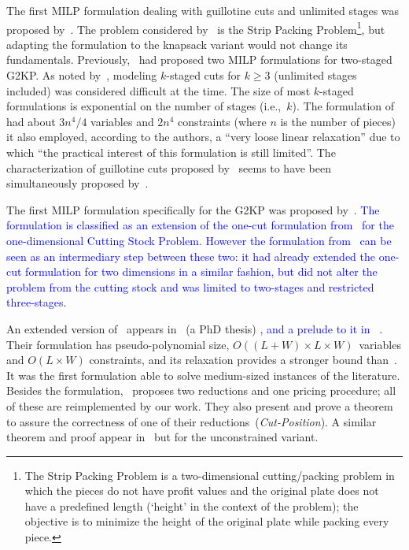 \documentclass[ppgc,tese,english,formais,babel]{iiufrgs}
\newif\iffinalversion
\newcommand{\newtext}[1]{\iffinalversion%
#1%
\else%
\textcolor{blue}{#1}%
\fi%
}
\begin{document}
The first MILP formulation dealing with guillotine cuts and unlimited stages was proposed by~\citet{messaoud:2008}.
The problem considered by~\citet{messaoud:2008} is the Strip Packing Problem\footnote{The Strip Packing Problem is a two-dimensional cutting/packing problem in which the pieces do not have profit values and the original plate does not have a predefined length (`height' in the context of the problem); the objective is to minimize the height of the original plate while packing every piece.}, but adapting the formulation to the knapsack variant would not change its fundamentals.
Previously, \citet{lodi:2003}~had proposed two MILP formulations for two-staged G2KP.
As noted by~\citet{belov_thesis:2003}, modeling \(k\)-staged cuts for \(k \geq 3\) (unlimited stages included) was considered difficult at the time.
The size of most \(k\)-staged formulations is exponential on the number of stages (i.e.,~\(k\)).
The formulation of~\citet{messaoud:2008} had about \(3n^4/4\) variables and \(2n^4\) constraints (where \(n\) is the number of pieces) it also employed, according to the authors, a ``very loose linear relaxation'' due to which ``the practical interest of this formulation is still limited''.
The characterization of guillotine cuts proposed by~\citet{messaoud:2008} seems to have been simultaneously proposed by~\citet{pisinger:2007}. %

The first MILP formulation specifically for the G2KP was proposed by~\citet{furini:2016}.
\newtext{The formulation is classified as an extension of the one-cut formulation from~\citet{dyckhoff:1981} for the one-dimensional Cutting Stock Problem.
However the formulation from~\citet{silva:2010} can be seen as an intermediary step between these two: it had already extended the one-cut formulation for two dimensions in a similar fashion, but did not alter the problem from the cutting stock and was limited to two-stages and restricted three-stages.}
An extended version of~\citet{furini:2016} appears in~\citet{dimitri_thesis} (a PhD thesis)\newtext{, and a prelude to it in~\citet{furini:conference:2016}}.
Their formulation has pseudo-polynomial size, \(O((L + W) \times L \times W)\)~variables and \(O(L \times W)\) constraints, and its relaxation provides a stronger bound than~\citet{messaoud:2008}.
It was the first formulation able to solve medium-sized instances of the literature.
Besides the formulation, \citet{furini:2016}~proposes two reductions and one pricing procedure; all of these are reimplemented by our work.
They also present and prove a theorem to assure the correctness of one of their reductions~(\emph{Cut-Position}).
A similar theorem and proof appear in~\citet{song:2010} but for the unconstrained variant.
\end{document}
